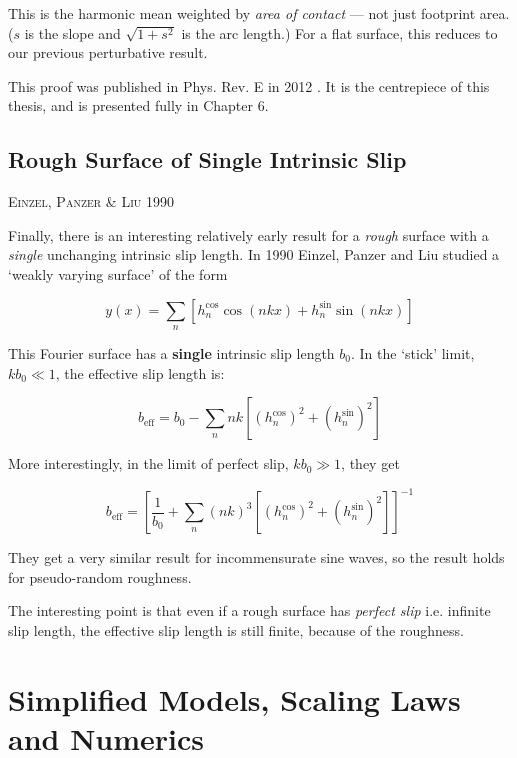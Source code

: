 \documentclass[a4paper]{report}
\newcommand{\beff}{\ensuremath{b_{\mathrm{eff}}}}
\newcommand{\paper}[1]
         {\colorbox[gray]{0.8}{ \textsc{#1}}
         
         }
\begin{document}
This is the harmonic mean weighted by \emph{area of contact} --- not just footprint area.  ($s$ is the slope and $\sqrt{1+s^2}$ is the arc length.)  For a flat surface, this reduces to our previous perturbative result.

This proof was published in Phys. Rev. E in 2012 \cite{Lund2012}.  It is the centrepiece of this thesis, and is presented fully in Chapter 6.


\subsection*{Rough Surface of Single Intrinsic Slip}

\paper{Einzel, Panzer \& Liu 1990}
Finally, there is an interesting relatively early result for a \emph{rough} surface with a \emph{single} unchanging intrinsic slip length.  In 1990 Einzel, Panzer and Liu \cite{EinzelPanzerLiu1990} studied a `weakly varying surface' of the form

\begin{equation*}
y(x) = \sum_n \left[ h_n^{\cos} \cos(nkx) + h_n^{\sin} \sin(nkx) \right]
\end{equation*} 

This Fourier surface has a \textbf{single} intrinsic slip length $b_0$.  In the `stick' limit, $kb_0 \ll 1$, the effective slip length is:

\begin{equation*}
\beff = b_0 - \sum_n nk \left[ (h_n^{\cos})^2 + (h_n^{\sin})^2  \right]
\end{equation*}

More interestingly, in the limit of perfect slip, $kb_0 \gg 1$, they get

\begin{equation*}
\beff = \left[ \frac{1}{b_0} + \sum_n (nk)^3 \left[ (h_n^{\cos})^2 + (h_n^{\sin})^2 \right]
 \right]^{-1}
\end{equation*}

They get a very similar result for incommensurate sine waves, so the result holds for pseudo-random roughness.

The interesting point is that even if a rough surface has \emph{perfect slip} i.e. infinite slip length, the effective slip length is still finite, because of the roughness.


\section*{Simplified Models, Scaling Laws and Numerics}
\end{document}
